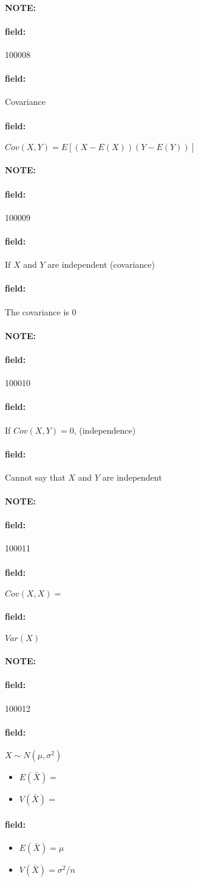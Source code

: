 \documentclass[12pt]{article}
\newenvironment{note}{\paragraph{NOTE:}}{}
\newenvironment{field}{\paragraph{field:}}{}
\begin{document}
\begin{note} \begin{field} \tiny 100008 \end{field}
 \begin{field}
  Covariance
 \end{field}
 \begin{field}
  $Cov(X,Y) = E[(X - E(X))(Y - E(Y))]$
 \end{field}
\end{note}

\begin{note} \begin{field} \tiny 100009 \end{field}
 \begin{field}
  If $X$ and $Y$ are independent (covariance)
 \end{field}
 \begin{field}
  The covariance is 0
 \end{field}
\end{note}

\begin{note} \begin{field} \tiny 100010 \end{field}
 \begin{field}
  If $Cov(X,Y) = 0$, (independence)
 \end{field}
 \begin{field}
  Cannot say that $X$ and $Y$ are independent
 \end{field}
\end{note}

\begin{note} \begin{field} \tiny 100011 \end{field}
 \begin{field}
  $Cov(X,X) =$
 \end{field}
 \begin{field}
  $Var(X)$
 \end{field}
\end{note}

\begin{note} \begin{field} \tiny 100012 \end{field}
 \begin{field}
  $X \sim N(\mu,\sigma^2)$
  \begin{itemize}
   \item $E(\bar{X}) = $
   \item $V(\bar{X}) = $
  \end{itemize}
 \end{field}
 \begin{field}
  \begin{itemize}
   \item $E(\bar{X}) = \mu$
   \item $V(\bar{X}) = \sigma^2/n$
  \end{itemize}
 \end{field}
\end{note}
\end{document}
